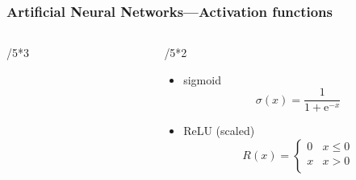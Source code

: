 \documentclass[
  aspectratio=1610, %
]{beamer}
\begin{document}
\begin{frame}
 \frametitle{Artificial Neural Networks---Activation functions}
 \begin{columns}
  \begin{column}{\linewidth/5*3}
  \end{column}
  \begin{column}{\linewidth/5*2}
   \begin{itemize}
    \item sigmoid
     \[
      \sigma(x) = \frac{1}{1+\mathrm{e}^{-x}}
     \]
    \item<2> ReLU (scaled)
     \[
      R(x) = \begin{cases}
       0 & x \leq 0 \\
       x & x > 0\\
      \end{cases}
     \]
   \end{itemize}
  \end{column}
 \end{columns}
\end{frame}


\end{document}
